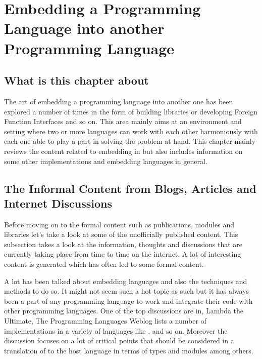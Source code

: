 \documentclass[thesis-solanki.tex]{subfiles}
\begin{document}
\chapter{Embedding a Programming Language into another Programming Language }\label{chap:embedding}


\section{What is this chapter about}

The art of embedding a programming language into another one has been explored a number of times in the form
of building libraries or developing Foreign Function Interfaces and so on. This area mainly aims at an environment
and setting where two or more languages can work with each other harmoniously with each one able to play a part
in solving the problem at hand. This chapter mainly reviews the content related to embedding  in
 but also includes information on some other implementations and embedding languages in
general.


\section{The Informal Content from Blogs, Articles and Internet Discussions}

Before moving on to the formal content such as publications, modules and libraries let's take a look at some of the
unofficially published content.
This subsection takes a look at the information, thoughts and discussions that are currently taking place from time
to time on the internet.
A lot of interesting content is generated which has often led to some formal content.

A lot has been talked about embedding languages and also the techniques and methods to do so.
It might not seem such a hot topic as such but it has always been a part of any programming language to work and
integrate their code with other programming languages.
One of the top discussions are in, Lambda the Ultimate, The Programming Languages Weblog
\cite{website:lambda-the-ultimate} lists a number of  implementations in a variety of
languages like ,  \cite{racklog} and so on.
Moreover the discussion focuses on a lot of critical points that should be considered in a translation of
 to the host language in terms of types and modules among others.
\end{document}
